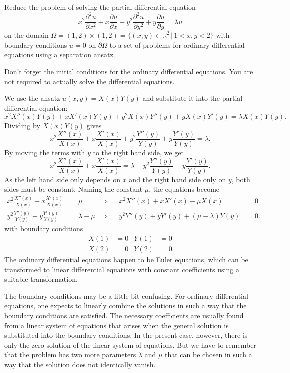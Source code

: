 Reduce the problem of solving the partial differential equation
\[
x^2\frac{\partial^2 u}{\partial x^2}
+x\frac{\partial u}{\partial x}
+y^2\frac{\partial^2 u}{\partial y^2}
+y\frac{\partial u}{\partial y}
=\lambda u
\]
on the domain
$\Omega=(1,2)\times(1,2)=\{ (x,y)\in\mathbb R^2\,|\, 1<x,y<2\}$
with boundary conditions
$u=0$ on $\partial\Omega$
to a set of problems for ordinary differential equations using a
separation ansatz.

\begin{hinweis}
Don't forget the initial conditions for the ordinary differential
equations.
You are not required to actually solve the differential equations.
\end{hinweis}

\begin{loesung}
We use the ansatz
$u(x,y)=X(x)Y(y)$ and substitute it into the partial differential
equation:
\[
x^2X''(x)Y(y)
+xX'(x)Y(y)
+y^2X(x)Y''(y)
+yX(x)Y'(y)=\lambda X(x)Y(y).
\]
Dividing by $X(x)Y(y)$ gives
\[
x^2\frac{X''(x)}{X(x)}
+x\frac{X'(x)}{X(x)}
+y^2\frac{Y''(y)}{Y(y)}
+y\frac{Y'(y)}{Y(y)}=\lambda.
\]
By moving the terms with $y$ to the right hand side, we get
\[
x^2\frac{X''(x)}{X(x)}
+x\frac{X'(x)}{X(x)}
=
\lambda
-y^2\frac{Y''(y)}{Y(y)}
-y\frac{Y'(y)}{Y(y)}.
\]
As the left hand side only depends on $x$ and the right hand side only
on $y$, both sides must be constant.
Naming the constant $\mu$, the equations become
\begin{align*}
x^2\frac{X''(x)}{X(x)}
+x\frac{X'(x)}{X(x)}&=\mu
&\Rightarrow&
&
x^2X''(x)+xX'(x)-\mu X(x)&=0
\\
y^2\frac{Y''(y)}{Y(y)}
+y\frac{Y'(y)}{Y(y)}&=\lambda-\mu
&\Rightarrow&
&
y^2Y''(y)+yY'(y)+(\mu-\lambda) Y(y)&=0.
\end{align*}
with boundary conditions
\begin{align*}
X(1)&=0&Y(1)&=0\\
X(2)&=0&Y(2)&=0
\end{align*}
The ordinary differential equations happen to be Euler equations,
which can be transformed to linear differential equations with constant
coefficients using a suitable transformation.
\end{loesung}

\begin{diskussion}
The boundary conditions may be a little bit confusing.
For ordinary differential equations, one expects to linearly combine
the solutions in such a way that the boundary conditions are satisfied.
The necessary coefficients are usually found from a linear system of
equations that arises when the general solution is substituted into
the boundary conditions.
In the present case, however, there is only the zero solution of
the linear system of equations.
But we have to remember that the problem has two more parameters
$\lambda$ and $\mu$ that can be chosen in such a way that the 
solution does not identically vanish.
\end{diskussion}
